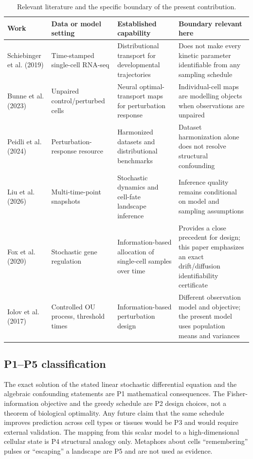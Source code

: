 \documentclass[11pt,a4paper]{article}
\begin{document}
\begin{table}[!htbp]
\centering
\small
\caption{Relevant literature and the specific boundary of the present contribution.}
\label{tab:literature}
\begin{tabularx}{\linewidth}{@{}p{2.35cm}p{2.25cm}X X@{}}
\toprule
Work & Data or model setting & Established capability & Boundary relevant here\\
\midrule
Schiebinger et al. (2019) & Time-stamped single-cell RNA-seq & Distributional transport for developmental trajectories & Does not make every kinetic parameter identifiable from any sampling schedule\\
Bunne et al. (2023) & Unpaired control/perturbed cells & Neural optimal-transport maps for perturbation response & Individual-cell maps are modelling objects when observations are unpaired\\
Peidli et al. (2024) & Perturbation-response resource & Harmonized datasets and distributional benchmarks & Dataset harmonization alone does not resolve structural confounding\\
Liu et al. (2026) & Multi-time-point snapshots & Stochastic dynamics and cell-fate landscape inference & Inference quality remains conditional on model and sampling assumptions\\
Fox et al. (2020) & Stochastic gene regulation & Information-based allocation of single-cell samples over time & Provides a close precedent for design; this paper emphasizes an exact drift/diffusion identifiability certificate\\
Iolov et al. (2017) & Controlled OU process, threshold times & Information-based perturbation design & Different observation model and objective; the present model uses population means and variances\\
\bottomrule
\end{tabularx}
\end{table}
\subsection{P1--P5 classification}
The exact solution of the stated linear stochastic differential equation and the algebraic confounding statements are P1 mathematical consequences. The Fisher-information objective and the greedy schedule are P2 design choices, not a theorem of biological optimality. Any future claim that the same schedule improves prediction across cell types or tissues would be P3 and would require external validation. The mapping from this scalar model to a high-dimensional cellular state is P4 structural analogy only. Metaphors about cells “remembering” pulses or “escaping” a landscape are P5 and are not used as evidence.
\end{document}
